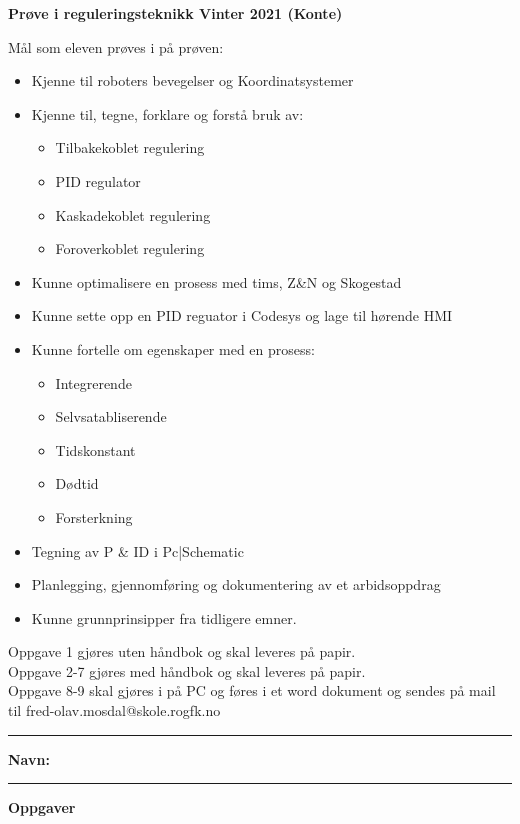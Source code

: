 \documentclass[12pt,a4paper]{article}
\begin{document}
\LARGE
\centerline{\bf Prøve i reguleringsteknikk Vinter 2021 (Konte)}  \bigskip
\normalsize
Mål som eleven prøves i på prøven: 
\begin{itemize}[noitemsep]
\item Kjenne til roboters bevegelser og Koordinatsystemer 
\item Kjenne til, tegne, forklare og forstå bruk av: 
\begin{itemize}[noitemsep]
	\item Tilbakekoblet regulering 
	\item PID regulator 
	\item Kaskadekoblet regulering 
	\item Foroverkoblet regulering 
\end{itemize}
\item Kunne optimalisere en prosess med tims, Z\&N og Skogestad 
\item Kunne sette opp en PID reguator i Codesys og lage til hørende HMI 
\item Kunne fortelle om egenskaper med en prosess: 
\begin{itemize}[noitemsep]
	\item Integrerende 
	\item Selvsatabliserende 
	\item Tidskonstant 
	\item Dødtid 
	\item Forsterkning 
\end{itemize}
\item Tegning av P \& ID i Pc|Schematic 
\item Planlegging, gjennomføring og dokumentering av et arbidsoppdrag
\item Kunne grunnprinsipper fra tidligere emner. 
\end{itemize}



Oppgave 1 gjøres uten håndbok og skal leveres på papir. \\
Oppgave 2-7 gjøres med håndbok og skal leveres på papir. \\
Oppgave 8-9 skal gjøres i på PC og føres i et word  dokument og sendes på mail til fred-olav.mosdal@skole.rogfk.no\\

\bigskip 
\hrule
\bigskip 
\textbf{Navn:}\bigskip 
\hrule
\vfil \eject
\centerline{\bf Oppgaver}
\end{document}

